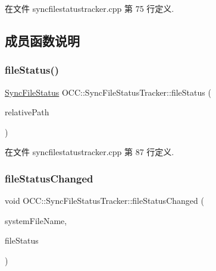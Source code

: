 在文件 syncfilestatustracker.\+cpp 第 75 行定义.



\subsection{成员函数说明}
\mbox{\label{class_o_c_c_1_1_sync_file_status_tracker_a89d86ea92cbc17fefcdfe68cfd4f5f5c}} 
\subsubsection{\texorpdfstring{file\+Status()}{fileStatus()}}
{\footnotesize\ttfamily \hyperlink{class_o_c_c_1_1_sync_file_status}{Sync\+File\+Status} O\+C\+C\+::\+Sync\+File\+Status\+Tracker\+::file\+Status (\begin{DoxyParamCaption}\item[{const Q\+String \&}]{relative\+Path }\end{DoxyParamCaption})}



在文件 syncfilestatustracker.\+cpp 第 87 行定义.

\mbox{\label{class_o_c_c_1_1_sync_file_status_tracker_a7ef7a0b3f3771ef113f10fbd42f22726}} 
\subsubsection{\texorpdfstring{file\+Status\+Changed}{fileStatusChanged}}
{\footnotesize\ttfamily void O\+C\+C\+::\+Sync\+File\+Status\+Tracker\+::file\+Status\+Changed (\begin{DoxyParamCaption}\item[{const Q\+String \&}]{system\+File\+Name,  }\item[{\hyperlink{class_o_c_c_1_1_sync_file_status}{Sync\+File\+Status}}]{file\+Status }\end{DoxyParamCaption})\hspace{0.3cm}{\ttfamily [signal]}}

